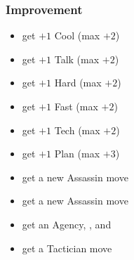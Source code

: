 \subsubsection{Improvement}
\begin{itemize}
\item get $+1$ Cool (max $+2$)
\item get $+1$ Talk (max $+2$)
\item get $+1$ Hard (max $+2$)
\item get $+1$ Fast (max $+2$)
\item get $+1$ Tech (max $+2$)
\item get $+1$ Plan (max $+3$)
\item get a new Assassin move
\item get a new Assassin move
\item get an Agency, , and 
\item get a Tactician move
\end{itemize}
